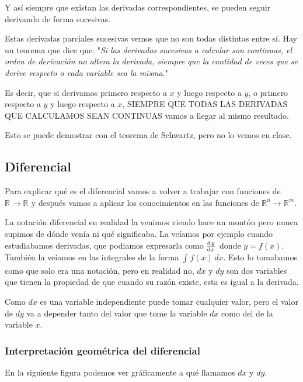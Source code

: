\documentclass[12pt]{article}
\begin{document}
Y así siempre que existan las derivadas correspondientes, se pueden seguir derivando de forma sucesivas.

Estas derivadas parciales sucesivas vemos que no son todas distintas entre sí. Hay un teorema que dice que: "\textit{Si las derivadas sucesivas a calcular son continuas, el orden de derivación no altera la derivada, siempre que la cantidad de veces que se derive respceto a cada variable sea la misma}."

Es decir, que si derivamos primero respecto a $ x $ y luego respecto a $ y $, o primero respecto a $ y $ y luego respecto a $ x $, SIEMPRE QUE TODAS LAS DERIVADAS QUE CALCULAMOS SEAN CONTINUAS vamos a llegar al mismo resultado.

Esto se puede demostrar con el teorema de Schwartz, pero no lo vemos en clase.

\subsection{Diferencial}
Para explicar qué es el diferencial vamos a volver a trabajar con funciones de $ \mathbb{R}^{}\to\mathbb{R}^{} $ y después vamos a aplicar los conocimientos en las funciones de $ \mathbb{R}^{n}\to\mathbb{R}^{m} $.

La notación diferencial en realidad la venimos viendo hace un montón pero nunca supimos de dónde venía ni qué significaba. La veíamos por ejemplo cuando estudiabamos derivadas, que podiamos expresarla como $ \dv[]{y}{x} $ donde $ y = f(x) $. También la veíamos en las integrales de la forma $ \int_{}^{} f(x) \,dx $. Esto lo tomabamos como que solo era una notación, pero en realidad no, $ dx $ y $ dy $ son dos variables que tienen la propiedad de que cuando su razón existe, esta es igual a la derivada.

\vspace{0.2cm}

Como $ dx $ es una variable independiente puede tomar cualquier valor, pero el valor de $ dy $ va a depender tanto del valor que tome la variable $ dx $ como del de la variable $ x $.

\subsubsection{Interpretación geométrica del diferencial}
En la siguiente figura podemos ver gráficamente a qué llamamos $ dx $ y $ dy $.
\end{document}
